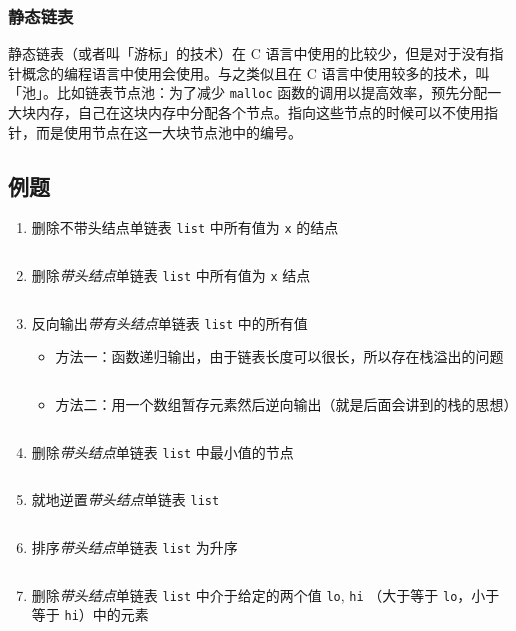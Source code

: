 \documentclass{ctexart}
\begin{document}
\subsubsection{静态链表}
静态链表（或者叫「游标」的技术）在 C 语言中使用的比较少，但是对于没有指针概念的编程语言中使用会使用。与之类似且在 C 语言中使用较多的技术，叫「池」。比如链表节点池：为了减少 \texttt{malloc} 函数的调用以提高效率，预先分配一大块内存，自己在这块内存中分配各个节点。指向这些节点的时候可以不使用指针，而是使用节点在这一大块节点池中的编号。

\subsection{例题}
\begin{enumerate}
    \item 删除不带头结点单链表 \texttt{list} 中所有值为 \texttt{x} 的结点
        \inputminted{c}{codes/delete-all-x-from-list.c}

    \item 删除\emph{带头结点}单链表 \texttt{list} 中所有值为 \texttt{x} 结点
        \inputminted{c}{codes/delete-all-x-from-list2.c}

    \item 反向输出\emph{带有头结点}单链表 \texttt{list} 中的所有值
        \begin{itemize}
            \item 方法一：函数递归输出，由于链表长度可以很长，所以存在栈溢出的问题
                \inputminted{c}{codes/print-list-revsersely1.c}
            \item 方法二：用一个数组暂存元素然后逆向输出（就是后面会讲到的栈的思想）
                \inputminted{c}{codes/print-list-revsersely2.c}
        \end{itemize}

    \item 删除\emph{带头结点}单链表 \texttt{list} 中最小值的节点
        \inputminted{c}{codes/delete-minimal-value-from-list.c}

    \item 就地逆置\emph{带头结点}单链表 \texttt{list}
        \inputminted{c}{codes/reverse-list-in-place.c}

    \item 排序\emph{带头结点}单链表 \texttt{list} 为升序
        \inputminted{c}{codes/sort-list.c}

    \item 删除\emph{带头结点}单链表 \texttt{list} 中介于给定的两个值 \texttt{lo}, \texttt{hi} （大于等于 \texttt{lo}，小于等于 \texttt{hi}）中的元素
        \inputminted{c}{codes/delete-values-between-lo-hi-from-list.c}
\end{enumerate}
\end{document}
